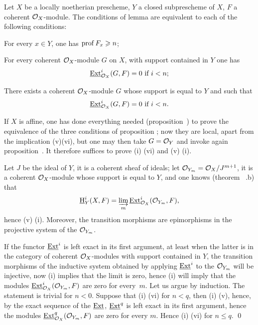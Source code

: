 \begin{proposition} \label{III.3.3}
Let $X$ be a locally noetherian prescheme, $Y$ a closed subprescheme of $X$, $F$ a coherent $\mathcal{O}_X$-module. The conditions of lemma  are equivalent to each of the following conditions:
\begin{enumeratei}
\setcounter{enumi}{3}
\item
For every $x\in Y$, one has $\operatorname{prof} F_x \geqslant n$;

\item
For every coherent $\mathcal{O}_X$-module $G$ on $X$, with support contained in $Y$ one has
\[
\operatorname{\underline{Ext}}_{\mathcal{O}_X}^i(G, F)=0 \text{ if } i<n;
\]

\item
There exists a coherent $\mathcal{O}_X$-module $G$ whose support is equal to $Y$ and such that
\[
\operatorname{\underline{Ext}}_{\mathcal{O}_X}^i(G, F)=0 \text{ if } i<n.
\]
\end{enumeratei}
\end{proposition}

If $X$ is affine, one has done everything needed (\cf proposition~) to prove the equivalence of the three conditions of proposition ; now they are local, apart from the implication (v)\ALORS (vi), but one may then take $G={\mathcal O}_Y$ and invoke again proposition~. It therefore suffices to prove (i) \ALORS (vi) and (v) \ALORS (i).

Let $J$ be the ideal of $Y$, it is a coherent sheaf of ideals; let ${\mathcal O}_{Y_m} = \mathcal{O}_X/J^{m+1}$, it is a coherent $\mathcal{O}_X$-module whose support is equal to $Y$, and one knows (theorem ~.b) that
\[
\operatorname{\underline{H}}_Y^i(X, F) = \varinjlim_m \operatorname{\underline{Ext}}_{\mathcal{O}_X}^i({\mathcal O}_{Y_m}, F),
\]
hence (v) \ALORS (i). Moreover, the transition morphisms are epimorphisms in the projective system of the ${\mathcal O}_{Y_m}$.

If the functor $\operatorname{\underline{Ext}}^i$ is left exact in its first argument, at least when the latter is in the category of coherent $\mathcal{O}_X$-modules with support contained in $Y$, the transition morphisms of the inductive system obtained by applying $\operatorname{\underline{Ext}}^i$ to the ${\mathcal O}_{Y_m}$ will be injective, now (i) implies that the limit is zero, hence (i) will imply that the modules $\operatorname{\underline{Ext}}_{\mathcal{O}_X}^i({\mathcal O}_{Y_m}, F)$ are zero for every~$m$. Let us argue by induction. The statement is trivial for $n<0$. Suppose that (i) \ALORS (vi) for $n<q$, then (i) \ALORS (v), hence, by the exact sequence of the $\operatorname{\underline{Ext}}$, $\operatorname{\underline{Ext}}^q$ is left exact in its first argument, hence the modules $\operatorname{\underline{Ext}}_{\mathcal{O}_X}^q({\mathcal O}_{Y_m}, F)$ are zero for every $m$. Hence (i) \ALORS (vi) for $n\leq q$.
\qed


